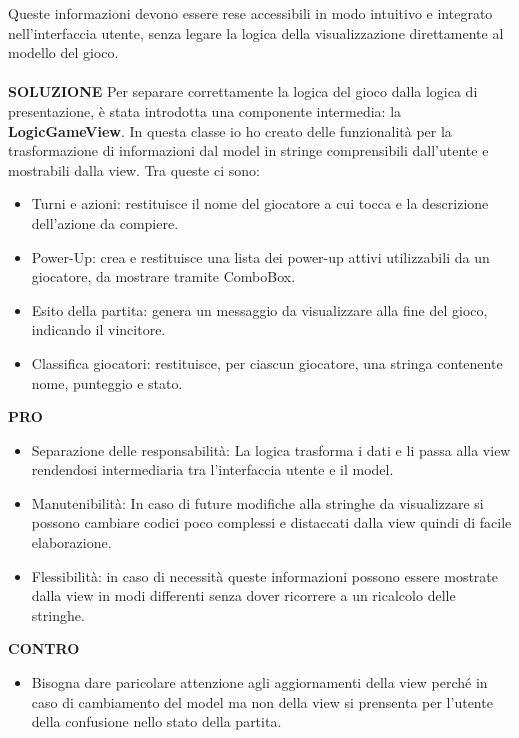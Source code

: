 \documentclass[a4paper,12pt]{report}
\begin{document}
Queste informazioni devono essere rese accessibili in modo intuitivo e integrato nell’interfaccia utente, 
senza legare la logica della visualizzazione direttamente al modello del gioco.
\\
\\
\textbf{SOLUZIONE}
Per separare correttamente la logica del gioco dalla logica di presentazione, è stata introdotta una componente intermedia: la \textbf{LogicGameView}.
In questa classe io ho creato delle funzionalità per la trasformazione di informazioni dal model in stringe comprensibili dall'utente e mostrabili dalla view.
Tra queste ci sono:
\begin{itemize}
	\item Turni e azioni: restituisce il nome del giocatore a cui tocca e la descrizione dell’azione da compiere.
	\item Power-Up: crea e restituisce una lista dei power-up attivi utilizzabili da un giocatore, da mostrare tramite ComboBox.
	\item Esito della partita: genera un messaggio da visualizzare alla fine del gioco, indicando il vincitore.
	\item Classifica giocatori: restituisce, per ciascun giocatore, una stringa contenente nome, punteggio e stato.
\end{itemize}
\textbf{PRO}
\begin{itemize}
	\item Separazione delle responsabilità: La logica trasforma i dati e li passa alla view rendendosi intermediaria tra l'interfaccia utente e il model.
	\item Manutenibilità: In caso di future modifiche alla stringhe da visualizzare si possono cambiare codici poco complessi e distaccati dalla view quindi di facile elaborazione.
	\item Flessibilità: in caso di necessità queste informazioni possono essere mostrate dalla view in modi differenti senza dover ricorrere a un ricalcolo delle stringhe.
\end{itemize}
\textbf{CONTRO}
\begin{itemize}
	\item Bisogna dare paricolare attenzione agli aggiornamenti della view perché in caso di cambiamento del model ma non della view si prensenta per l'utente della confusione 
	nello stato della partita.
\end{itemize}
\end{document}
